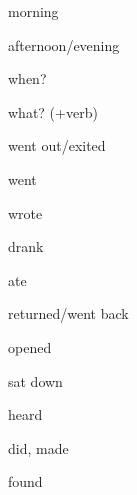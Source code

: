 \documentclass[avery5371,grid,frame]{flashcards}
\begin{document}
\begin{flashcard}{\LARGE morning}
\LARGE {}
\end{flashcard}
\begin{flashcard}{\LARGE afternoon/evening}
\LARGE {}
\end{flashcard}
\begin{flashcard}{\LARGE when?}
\LARGE {}
\end{flashcard}
\begin{flashcard}{\LARGE what? (+verb)}
\LARGE {}
\end{flashcard}
\begin{flashcard}{\LARGE went out/exited}
\LARGE {}
\end{flashcard}
\begin{flashcard}{\LARGE went}
\LARGE {}
\end{flashcard}
\begin{flashcard}{\LARGE wrote}
\LARGE {}
\end{flashcard}
\begin{flashcard}{\LARGE drank}
\LARGE {}
\end{flashcard}
\begin{flashcard}{\LARGE ate}
\LARGE {}
\end{flashcard}
\begin{flashcard}{\LARGE returned/went back}
\LARGE {}
\end{flashcard}
\begin{flashcard}{\LARGE opened}
\LARGE {}
\end{flashcard}
\begin{flashcard}{\LARGE sat down}
\LARGE {}
\end{flashcard}
\begin{flashcard}{\LARGE heard}
\LARGE {}
\end{flashcard}
\begin{flashcard}{\LARGE did, made}
\LARGE {}
\end{flashcard}
\begin{flashcard}{\LARGE found}
\LARGE {}
\end{flashcard}
\end{document}
